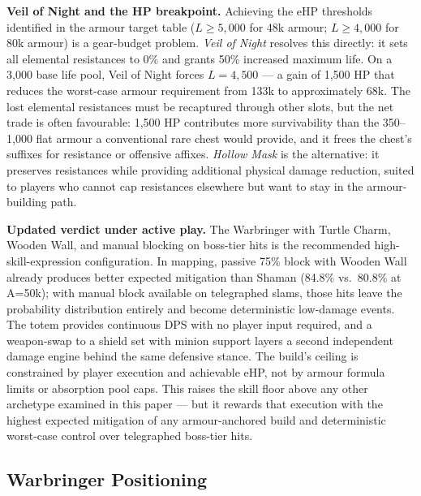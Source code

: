 \documentclass[12pt, letterpaper]{article}
\newcommand{\namedsubsection}[1]{%
    \subsection*{#1}%
    \addcontentsline{toc}{subsection}{#1}%
}
\begin{document}
\textbf{Veil of Night and the HP breakpoint.} Achieving the eHP thresholds identified in the armour target table ($L \geq 5{,}000$ for 48k armour; $L \geq 4{,}000$ for 80k armour) is a gear-budget problem. \textit{Veil of Night} resolves this directly: it sets all elemental resistances to 0\% and grants 50\% increased maximum life. On a 3{,}000 base life pool, Veil of Night forces $L = 4{,}500$ --- a gain of 1{,}500 HP that reduces the worst-case armour requirement from 133k to approximately 68k. The lost elemental resistances must be recaptured through other slots, but the net trade is often favourable: 1{,}500 HP contributes more survivability than the 350--1{,}000 flat armour a conventional rare chest would provide, and it frees the chest's suffixes for resistance or offensive affixes. \textit{Hollow Mask} is the alternative: it preserves resistances while providing additional physical damage reduction, suited to players who cannot cap resistances elsewhere but want to stay in the armour-building path.

\textbf{Updated verdict under active play.} The Warbringer with Turtle Charm, Wooden Wall, and manual blocking on boss-tier hits is the recommended high-skill-expression configuration. In mapping, passive 75\% block with Wooden Wall already produces better expected mitigation than Shaman (84.8\% vs.\ 80.8\% at A=50k); with manual block available on telegraphed slams, those hits leave the probability distribution entirely and become deterministic low-damage events. The totem provides continuous DPS with no player input required, and a weapon-swap to a shield set with minion support layers a second independent damage engine behind the same defensive stance. The build's ceiling is constrained by player execution and achievable eHP, not by armour formula limits or absorption pool caps. This raises the skill floor above any other archetype examined in this paper --- but it rewards that execution with the highest expected mitigation of any armour-anchored build and deterministic worst-case control over telegraphed boss-tier hits.

\namedsubsection{Warbringer Positioning}
\end{document}
